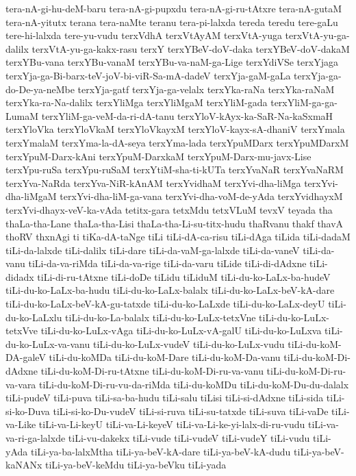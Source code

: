 {tera-nA-gi-hu-deM-baru
tera-nA-gi-pupxdu
tera-nA-gi-ru-tAtxre
tera-nA-gutaM
tera-nA-yitutx
terana
tera-naMte
teranu
tera-pi-lalxda
tereda
teredu
tere-gaLu
tere-hi-lalxda
tere-yu-vudu
terxVdhA
terxVtAyAM
terxVtA-yuga
terxVtA-yu-ga-dalilx
terxVtA-yu-ga-kakx-rasu
terxY
terxYBeV-doV-daka
terxYBeV-doV-dakaM
terxYBu-vana
terxYBu-vanaM
terxYBu-va-naM-ga-Lige
terxYdiVSe
terxYjaga
terxYja-ga-Bi-barx-teV-joV-bi-viR-Sa-mA-dadeV
terxYja-gaM-gaLa
terxYja-ga-do-De-ya-neMbe
terxYja-gatf
terxYja-ga-velalx
terxYka-raNa
terxYka-raNaM
terxYka-ra-Na-dalilx
terxYliMga
terxYliMgaM
terxYliM-gada
terxYliM-ga-ga-LumaM
terxYliM-ga-veM-da-ri-dA-tanu
terxYloV-kAyx-ka-SaR-Na-kaSxmaH
terxYloVka
terxYloVkaM
terxYloVkayxM
terxYloV-kayx-sA-dhaniV
terxYmala
terxYmalaM
terxYma-la-dA-seya
terxYma-lada
terxYpuMDarx
terxYpuMDarxM
terxYpuM-Darx-kAni
terxYpuM-DarxkaM
terxYpuM-Darx-mu-javx-Lise
terxYpu-ruSa
terxYpu-ruSaM
terxYtiM-sha-ti-kUTa
terxYvaNaR
terxYvaNaRM
terxYva-NaRda
terxYva-NiR-kAnAM
terxYvidhaM
terxYvi-dha-liMga
terxYvi-dha-liMgaM
terxYvi-dha-liM-ga-vana
terxYvi-dha-voM-de-yAda
terxYvidhayxM
terxYvi-dhayx-veV-ka-vAda
tetitx-gara
tetxMdu
tetxVLuM
tevxV
teyada
tha
thaLa-tha-Lane
thaLa-tha-Lisi
thaLa-tha-Li-su-titx-hudu
thaRvanu
thakf
thavA
thoRV
thxnAgi
ti
tiKa-dA-taNge
tiLi
tiLi-dA-ca-risu
tiLi-dAga
tiLida
tiLi-dadaM
tiLi-da-lalxde
tiLi-dalilx
tiLi-dare
tiLi-da-vaM-ga-lalxde
tiLi-da-vaneV
tiLi-da-vanu
tiLi-da-va-riMda
tiLi-da-va-rige
tiLi-da-varu
tiLide
tiLi-di-dAdxne
tiLi-didadx
tiLi-di-ru-tAtxne
tiLi-doDe
tiLidu
tiLiduM
tiLi-du-ko-LaLx-ba-hudeV
tiLi-du-ko-LaLx-ba-hudu
tiLi-du-ko-LaLx-balalx
tiLi-du-ko-LaLx-beV-kA-dare
tiLi-du-ko-LaLx-beV-kA-gu-tatxde
tiLi-du-ko-LaLxde
tiLi-du-ko-LaLx-deyU
tiLi-du-ko-LaLxlu
tiLi-du-ko-La-balalx
tiLi-du-ko-LuLx-tetxVne
tiLi-du-ko-LuLx-tetxVve
tiLi-du-ko-LuLx-vAga
tiLi-du-ko-LuLx-vA-galU
tiLi-du-ko-LuLxva
tiLi-du-ko-LuLx-va-vanu
tiLi-du-ko-LuLx-vudeV
tiLi-du-ko-LuLx-vudu
tiLi-du-koM-DA-galeV
tiLi-du-koMDa
tiLi-du-koM-Dare
tiLi-du-koM-Da-vanu
tiLi-du-koM-Di-dAdxne
tiLi-du-koM-Di-ru-tAtxne
tiLi-du-koM-Di-ru-va-vanu
tiLi-du-koM-Di-ru-va-vara
tiLi-du-koM-Di-ru-vu-da-riMda
tiLi-du-koMDu
tiLi-du-koM-Du-du-dalalx
tiLi-pudeV
tiLi-puva
tiLi-sa-ba-hudu
tiLi-salu
tiLisi
tiLi-si-dAdxne
tiLi-sida
tiLi-si-ko-Duva
tiLi-si-ko-Du-vudeV
tiLi-si-ruva
tiLi-su-tatxde
tiLi-suva
tiLi-vaDe
tiLi-va-Like
tiLi-va-Li-keyU
tiLi-va-Li-keyeV
tiLi-va-Li-ke-yi-lalx-di-ru-vudu
tiLi-va-va-ri-ga-lalxde
tiLi-vu-dakekx
tiLi-vude
tiLi-vudeV
tiLi-vudeY
tiLi-vudu
tiLi-yAda
tiLi-ya-ba-lalxMtha
tiLi-ya-beV-kA-dare
tiLi-ya-beV-kA-dudu
tiLi-ya-beV-kaNANx
tiLi-ya-beV-keMdu
tiLi-ya-beVku
tiLi-yada
}
